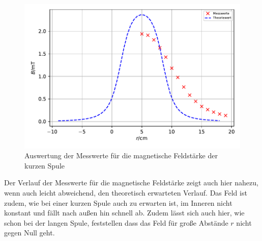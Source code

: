 \documentclass[
  bibliography=totoc,     %
  captions=tableheading,  %
  titlepage=firstiscover, %
]{scrartcl}
\begin{document}
  \begin{figure}
    \centering
    \includegraphics{kurze_spule.pdf}
    \caption{Auswertung der Messwerte für die magnetische 
    Feldstärke der kurzen Spule}
    \label{fig:kurze_spule}
  \end{figure}
  \FloatBarrier

  Der Verlauf der Messwerte für die magnetische Feldstärke zeigt auch hier nahezu, wenn auch leicht abweichend, den
  theoretisch erwarteten Verlauf. Das Feld ist zudem, wie bei einer kurzen Spule auch zu erwarten ist, im Inneren 
  nicht konstant und fällt nach außen hin schnell ab. Zudem lässt sich auch hier, wie schon bei der langen Spule,
  feststellen dass das Feld für große Abstände $r$ nicht gegen Null geht.
\end{document}
